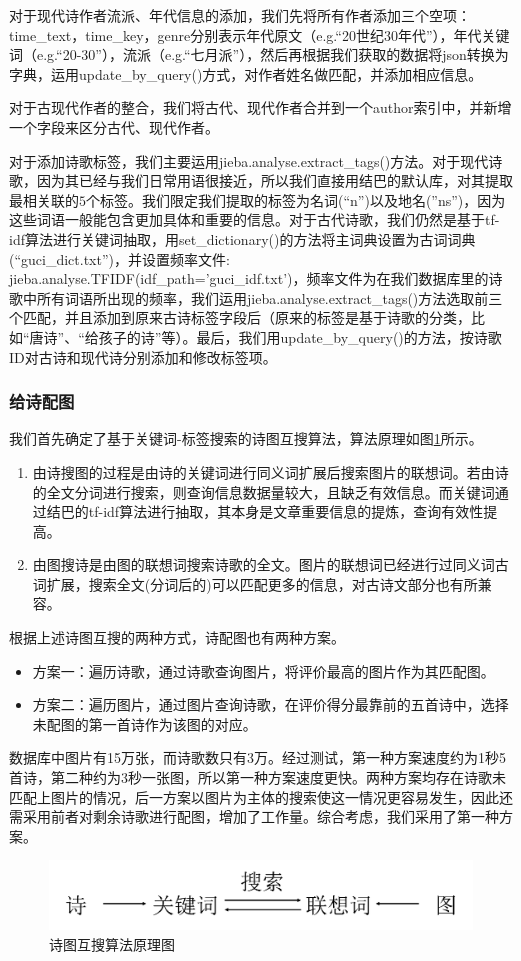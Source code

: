 \documentclass[a4paper, 10pt]{article}
\begin{document}
对于现代诗作者流派、年代信息的添加，我们先将所有作者添加三个空项：time\_text，time\_key，genre分别表示年代原文（e.g.“20世纪30年代”），年代关键词（e.g.“20-30”），流派（e.g.“七月派”），然后再根据我们获取的数据将json转换为字典，运用update\_by\_query()方式，对作者姓名做匹配，并添加相应信息。

对于古现代作者的整合，我们将古代、现代作者合并到一个author索引中，并新增一个字段来区分古代、现代作者。

对于添加诗歌标签，我们主要运用jieba.analyse.extract\_tags()方法。对于现代诗歌，因为其已经与我们日常用语很接近，所以我们直接用结巴的默认库，对其提取最相关联的$5$个标签。我们限定我们提取的标签为名词(“n”)以及地名(”ns”)，因为这些词语一般能包含更加具体和重要的信息。对于古代诗歌，我们仍然是基于tf-idf算法进行关键词抽取，用set\_dictionary()的方法将主词典设置为古词词典(“guci\_dict.txt”)，并设置频率文件: jieba.analyse.TFIDF(idf\_path='guci\_idf.txt')，频率文件为在我们数据库里的诗歌中所有词语所出现的频率，我们运用jieba.analyse.extract\_tags()方法选取前三个匹配，并且添加到原来古诗标签字段后（原来的标签是基于诗歌的分类，比如“唐诗”、“给孩子的诗”等）。最后，我们用update\_by\_query()的方法，按诗歌ID对古诗和现代诗分别添加和修改标签项。

\subsubsection{给诗配图}
我们首先确定了基于关键词-标签搜索的诗图互搜算法，算法原理如图\ref{fig:poemimg}所示。
\begin{enumerate}[(1)]
    \item 由诗搜图的过程是由诗的关键词进行同义词扩展后搜索图片的联想词。若由诗的全文分词进行搜索，则查询信息数据量较大，且缺乏有效信息。而关键词通过结巴的tf-idf算法进行抽取，其本身是文章重要信息的提炼，查询有效性提高。
    \item 由图搜诗是由图的联想词搜索诗歌的全文。图片的联想词已经进行过同义词古词扩展，搜索全文(分词后的)可以匹配更多的信息，对古诗文部分也有所兼容。
\end{enumerate}

根据上述诗图互搜的两种方式，诗配图也有两种方案。
\begin{itemize}
    \item 方案一：遍历诗歌，通过诗歌查询图片，将评价最高的图片作为其匹配图。
    \item 方案二：遍历图片，通过图片查询诗歌，在评价得分最靠前的五首诗中，选择未配图的第一首诗作为该图的对应。
\end{itemize}

数据库中图片有15万张，而诗歌数只有3万。经过测试，第一种方案速度约为1秒5首诗，第二种约为3秒一张图，所以第一种方案速度更快。两种方案均存在诗歌未匹配上图片的情况，后一方案以图片为主体的搜索使这一情况更容易发生，因此还需采用前者对剩余诗歌进行配图，增加了工作量。综合考虑，我们采用了第一种方案。
\begin{figure}[H]
\centering
\includegraphics[width=0.8\linewidth]{fig/poemimg.png}
\caption{诗图互搜算法原理图}
\label{fig:poemimg}
\end{figure}
\end{document}
